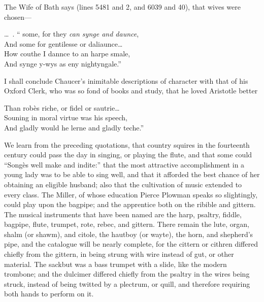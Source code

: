 

\renewcommand\rectoheader{notices of music by chaucer.}
\settowidth{\versewidth}{\ldots\  . “some, for they can synge and daunce,}

The Wife of Bath says (lines 5481 and 2, and 6039 and 40), that wives were
chosen—
\begin{scverse}\ldots\  . “	some, for they \textit{can synge and daunce},\\
And some for gentilesse or daliaunce\ldots\  \\
How couthe I dannce to an harpe smale,\\
And synge y-wys as eny nightyngale.”
\end{scverse}
I shall conclude Chaucer’s inimitable descriptions of character with that of his
Oxford Clerk, who was so fond of books and study, that he loved Aristotle better

\begin{scverse}Than robès riche, or fidel or sautrie\ldots\  \\
Souning in moral virtue was his speech,\\
And gladly would he lerne and gladly teche.”
\end{scverse}
We learn from the preceding quotations, that country squires in the fourteenth
century could pass the day in singing, or playing the flute, and that some could
“Songès well make and indite:” that the most attractive accomplishment in
a young lady was to be able to sing well, and that it afforded the best chance of
her obtaining an eligible husband; also that the cultivation of music extended
to every class. The Miller, of whose education Pierce Plowman speaks so slightingly,
could play upon the bagpipe; and the apprentice both on the ribible and
gittern. The musical instruments that have been named are the harp, psaltry,
fiddle, bagpipe, flute, trumpet, rote, rebec, and gittern. There remain the lute,
organ, shalm (or shawm), and citole, the hautboy (or wayte), the horn, and
shepherd’s pipe, and the catalogue will be nearly complete, for the cittern or
cithren differed chiefly from the gittern, in being strung with wire instead of gut,
or other material. The sackbut was a bass trumpet with a slide, %
like the modern
trombone; and the dulcimer differed chiefly from the psaltry in the wires being
struck, instead of being twitted by a plectrum, or quill, and therefore requiring
both hands to perform on it.

